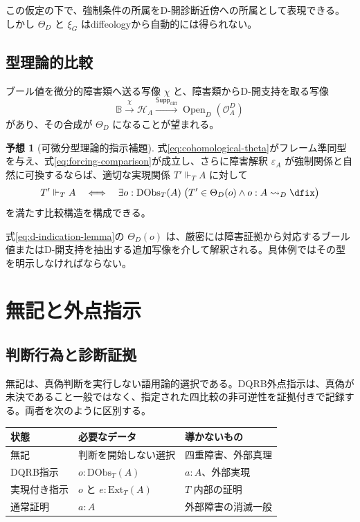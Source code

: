\documentclass[a4paper,11pt]{ltjsarticle}
\theoremstyle{definition}
\newtheorem{conjecture}[definition]{予想}
\theoremstyle{plain}
\newcommand{\DObs}{\mathrm{DObs}}
\newcommand{\Ext}{\mathrm{Ext}}
\newcommand{\OpenD}{\operatorname{Open}_{D}}
\begin{document}
この仮定の下で、強制条件の所属をD-開診断近傍への所属として表現できる。しかし $\Theta_D$ と $\xi_G$ はdiffeologyから自動的には得られない。

\subsection{型理論的比較}

ブール値を微分的障害類へ送る写像 $\chi$ と、障害類からD-開支持を取る写像
\begin{equation}
 \mathbb B\xrightarrow{\chi}\mathcal H_A
 \xrightarrow{\mathsf{Supp}_{\mathrm{diff}}}
 \OpenD(\mathcal O_A^D)
 \label{eq:cohomological-theta}
\end{equation}
があり、その合成が $\Theta_D$ になることが望まれる。

\begin{conjecture}[可微分型理論的指示補題]
式\eqref{eq:cohomological-theta}がフレーム準同型を与え、式\eqref{eq:forcing-comparison}が成立し、さらに障害解釈 $\varepsilon_A$ が強制関係と自然に可換するならば、適切な実現関係 $T'\Vdash_TA$ に対して
\begin{equation}
 T'\Vdash_TA
 \quad\Longleftrightarrow\quad
 \exists o:\DObs_T(A)\;
 \bigl(T'\in\Theta_D(o)
 \land o:A\rightsquigarrow_D\dfix\bigr)
 \label{eq:d-indication-lemma}
\end{equation}
を満たす比較構造を構成できる。
\end{conjecture}

式\eqref{eq:d-indication-lemma}の $\Theta_D(o)$ は、厳密には障害証拠から対応するブール値またはD-開支持を抽出する追加写像を介して解釈される。具体例ではその型を明示しなければならない。

\section{無記と外点指示}

\subsection{判断行為と診断証拠}

無記は、真偽判断を実行しない語用論的選択である。DQRB外点指示は、真偽が未決であること一般ではなく、指定された四比較の非可逆性を証拠付きで記録する。両者を次のように区別する。

\begin{center}
\begin{tabular}{p{} p{} p{}}
\toprule
状態 & 必要なデータ & 導かないもの \\
\midrule
無記 & 判断を開始しない選択 & 四重障害、外部真理 \\
DQRB指示 & $o:\DObs_T(A)$ & $a:A$、外部実現 \\
実現付き指示 & $o$ と $e:\Ext_T(A)$ & $T$ 内部の証明 \\
通常証明 & $a:A$ & 外部障害の消滅一般 \\
\bottomrule
\end{tabular}
\end{center}
\end{document}
